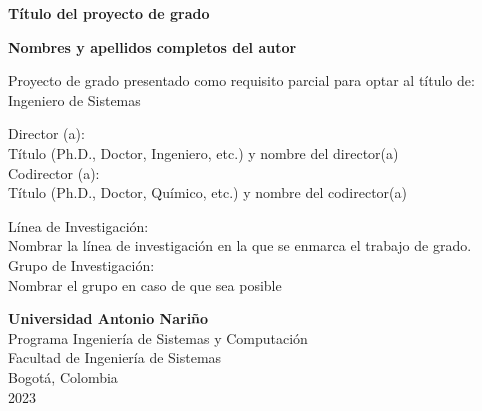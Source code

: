 \begin{titlepage}
    \begin{center}
        \vspace*{1cm}

        \Huge
        \textbf{Título del proyecto de grado}
 
        \vfill
        
        \large
        \textbf{Nombres y apellidos completos del autor}\\
 
        \vfill

        Proyecto de grado presentado como requisito parcial para optar al título de:\\
        Ingeniero de Sistemas\\

        \vfill

        Director (a):\\
        Título (Ph.D., Doctor, Ingeniero, etc.) y nombre del director(a)\\
        Codirector (a):\\
        Título (Ph.D., Doctor, Químico, etc.) y nombre del codirector(a)\\

        \vfill

        Línea de Investigación:\\
        Nombrar la línea de investigación en la que se enmarca el trabajo de grado.\\
        Grupo de Investigación:\\
        Nombrar el grupo en caso de que sea posible\\

             
        \vspace{0.8cm}
             
        \textbf{Universidad Antonio Nariño}\\
        Programa Ingeniería de Sistemas y Computación\\
        Facultad de Ingeniería de Sistemas\\
        Bogotá, Colombia\\
        2023
    \end{center}
\end{titlepage}
